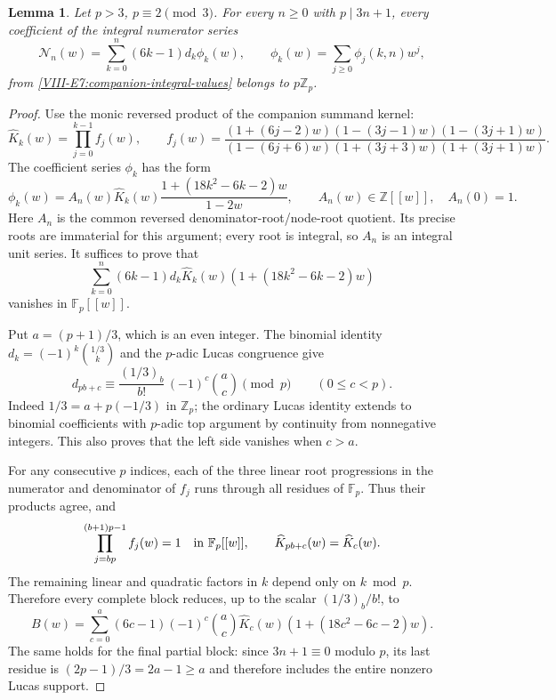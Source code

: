 \documentclass[11pt,letterpaper]{article}
\newtheorem{lemma}[theorem]{Lemma}
\numberwithin{equation}{section}
\begin{document}
\begin{lemma}\label{VIII-lem:e-companion-numerator-gain}
Let $p>3$, $p\equiv2\pmod3$. For every $n\ge0$ with
$p\mid3n+1$, every coefficient of the integral numerator series
\[
 \mathcal N_n(w)=\sum_{k=0}^n(6k-1)d_k\phi_k(w),
 \qquad \phi_k(w)=\sum_{j\ge0}\phi_j(k,n)w^j,
\]
from \eqref{VIII-E7:companion-integral-values} belongs to $p\mathbb Z_p$.
\end{lemma}
\begin{proof}
Use the monic reversed product of the companion summand kernel:
\[
 \widehat K_k(w)=\prod_{j=0}^{k-1} f_j(w),\qquad
 f_j(w)=
 \frac{(1+(6j-2)w)(1-(3j-1)w)(1-(3j+1)w)}
 {(1-(6j+6)w)(1+(3j+3)w)(1+(3j+1)w)}.
\]
The coefficient series $\phi_k$ has the form
\[
 \phi_k(w)=A_n(w)\widehat K_k(w)
                \frac{1+(18k^2-6k-2)w}{1-2w},
 \qquad A_n(w)\in\mathbb Z[[w]],\quad A_n(0)=1.
\]
Here $A_n$ is the common reversed denominator-root/node-root
quotient. Its precise roots are immaterial for this argument;
every root is integral, so $A_n$ is an integral unit series.
It suffices to prove that
\[
 \sum_{k=0}^n(6k-1)d_k\widehat K_k(w)
                       (1+(18k^2-6k-2)w)
\]
vanishes in $\mathbb F_p[[w]]$.

Put $a=(p+1)/3$, which is an even integer. The binomial identity
$d_k=(-1)^k\binom{1/3}{k}$ and the $p$-adic Lucas congruence give
\begin{equation}\label{VIII-eq:e-companion-lucas}
 d_{pb+c}\equiv
 \frac{(1/3)_b}{b!}\,(-1)^c\binom ac\pmod p
 \qquad(0\le c<p).
\end{equation}
Indeed $1/3=a+p(-1/3)$ in $\mathbb Z_p$; the ordinary Lucas
identity extends to binomial coefficients with $p$-adic top argument
by continuity from nonnegative integers. This also proves that the
left side vanishes when $c>a$.

For any consecutive $p$ indices, each of the three linear root
progressions in the numerator and denominator of $f_j$ runs through
all residues of $\mathbb F_p$. Thus their products agree, and
\[
 \prod_{j=b p}^{(b+1)p-1}f_j(w)=1
       \quad\hbox{in }\mathbb F_p[[w]],
 \qquad \widehat K_{pb+c}(w)=\widehat K_c(w).
\]
The remaining linear and quadratic factors in $k$ depend only on
$k\bmod p$. Therefore every complete block reduces, up to the scalar
$(1/3)_b/b!$, to
\[
 B(w)=\sum_{c=0}^a(6c-1)(-1)^c\binom ac\widehat K_c(w)
                       (1+(18c^2-6c-2)w).
\]
The same holds for the final partial block: since $3n+1\equiv0$
modulo $p$, its last residue is $(2p-1)/3=2a-1\ge a$ and
therefore includes the entire nonzero Lucas support.


\end{proof}
\end{document}
